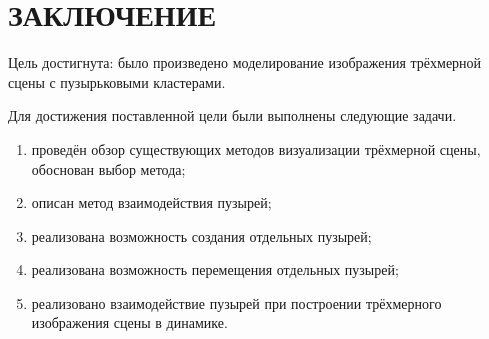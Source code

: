 \chapter*{ЗАКЛЮЧЕНИЕ}

Цель достигнута: было произведено моделирование изображения трёхмерной сцены с пузырьковыми кластерами.

Для достижения поставленной цели были выполнены следующие задачи.
\begin{enumerate}[label={\arabic*)}]
	\item проведён обзор существующих методов визуализации трёхмерной сцены, обоснован выбор метода;
	\item описан метод взаимодействия пузырей;
	\item реализована возможность создания отдельных пузырей;
	\item реализована возможность перемещения отдельных пузырей;
	\item реализовано взаимодействие пузырей при построении трёхмерного изображения сцены в динамике.
\end{enumerate}
